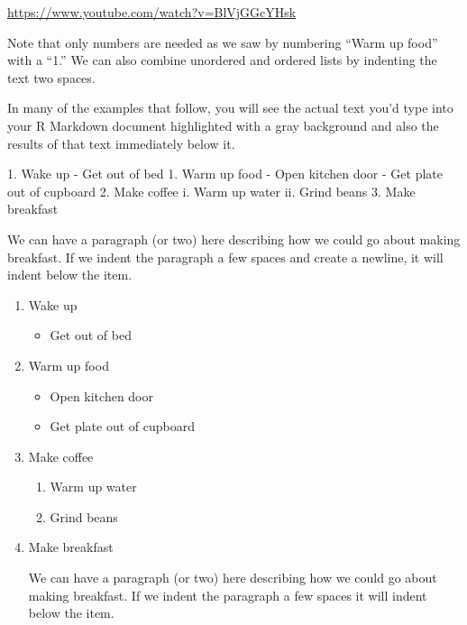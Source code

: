 \documentclass[]{tufte-book}
\newenvironment{Shaded}{\begin{snugshade}}{\end{snugshade}}
\newcommand{\NormalTok}[1]{#1}
\newcommand{\SpecialStringTok}[1]{\textcolor[rgb]{0.31,0.60,0.02}{#1}}
\providecommand{\tightlist}{%
  \setlength{\itemsep}{0pt}\setlength{\parskip}{0pt}}
\begin{document}
\vspace{0.1in}\begin{center}\footnotesize{\url{https://www.youtube.com/watch?v=BlVjGGcYHsk}}\end{center}\vspace{0.1in}

Note that only numbers are needed as we saw by numbering ``Warm up food'' with a ``1.'' We can also combine unordered and ordered lists by indenting the text two spaces.

In many of the examples that follow, you will see the actual text you'd type into your R Markdown document highlighted with a gray background and also the results of that text immediately below it.

\begin{Shaded}
\begin{Highlighting}[]
\SpecialStringTok{1. }\NormalTok{Wake up}
\SpecialStringTok{  {-} }\NormalTok{Get out of bed}
\SpecialStringTok{1. }\NormalTok{Warm up food}
\SpecialStringTok{  {-} }\NormalTok{Open kitchen door}
\SpecialStringTok{  {-} }\NormalTok{Get plate out of cupboard}
\SpecialStringTok{2. }\NormalTok{Make coffee}
\NormalTok{  i. Warm up water}
\NormalTok{  ii. Grind beans}
\SpecialStringTok{3. }\NormalTok{Make breakfast}

\NormalTok{  We can have a paragraph (or two) here describing how we could go about making}
\NormalTok{  breakfast. If we indent the paragraph a few spaces and create a newline, it}
\NormalTok{  will indent below the item.}
\end{Highlighting}
\end{Shaded}

\begin{enumerate}
\def\labelenumi{\arabic{enumi}.}
\item
  Wake up

  \begin{itemize}
  \tightlist
  \item
    Get out of bed
  \end{itemize}
\item
  Warm up food

  \begin{itemize}
  \tightlist
  \item
    Open kitchen door
  \item
    Get plate out of cupboard
  \end{itemize}
\item
  Make coffee

  \begin{enumerate}
  \def\labelenumii{\roman{enumii}.}
  \tightlist
  \item
    Warm up water
  \item
    Grind beans
  \end{enumerate}
\item
  Make breakfast

  We can have a paragraph (or two) here describing how we could go about making breakfast. If we indent the paragraph a few spaces it will indent below the item.
\end{enumerate}
\end{document}
